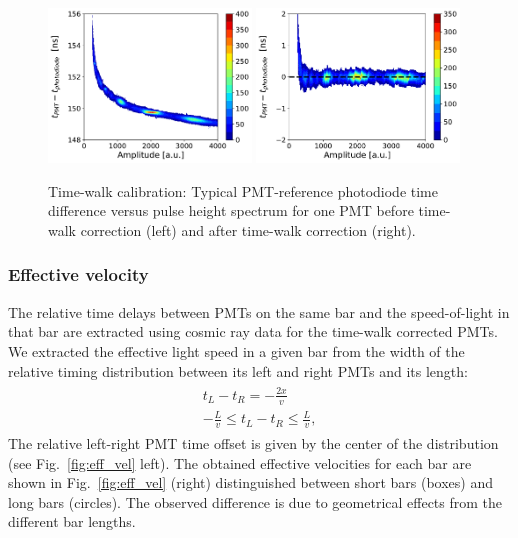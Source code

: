 \documentclass[3p,final,twocolumn]{elsarticle}
\begin{document}
\begin{figure}[tbh]
	\centering
		\includegraphics[width=0.48\textwidth]{timewalkpre.pdf}
		\includegraphics[width=0.48\textwidth]{timewalkpost.pdf}
	\caption{Time-walk calibration: Typical PMT-reference
          photodiode time difference versus pulse height spectrum for one PMT before time-walk correction (left) and after time-walk correction (right).}
	\label{fig:time_walk}
\end{figure}

\subsubsection{Effective velocity}
The relative time delays between PMTs on the same bar and the
speed-of-light in that bar are extracted using cosmic ray data for the
time-walk corrected PMTs. We extracted the effective light speed in
a given bar from the width of the
relative timing distribution between its left and right PMTs and its length:
\begin{eqnarray}
	\begin{split}
		t_L - t_R 	= -\frac{2x}{v}							\\
		 -\frac{L}{v}	\leq 	t_L - t_R 	\leq \frac{L}{v},				
		 \label{eqn:eff_vel}
	\end{split}
\end{eqnarray}
The relative left-right PMT time offset is given by the center of the
distribution (see Fig.~\ref{fig:eff_vel} left). The obtained effective
velocities for each bar are shown in Fig.~\ref{fig:eff_vel} (right)
distinguished between short bars (boxes) and long bars (circles). The
observed difference is due to geometrical effects from the different
bar lengths.
\end{document}
